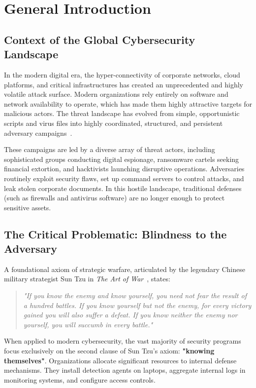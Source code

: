 \chapter*{General Introduction}

\section*{Context of the Global Cybersecurity Landscape}
In the modern digital era, the hyper-connectivity of corporate networks, cloud platforms, and critical infrastructures has created an unprecedented and highly volatile attack surface. Modern organizations rely entirely on software and network availability to operate, which has made them highly attractive targets for malicious actors. The threat landscape has evolved from simple, opportunistic scripts and virus files into highly coordinated, structured, and persistent adversary campaigns~\cite{networks_cybersecurity}. 

These campaigns are led by a diverse array of threat actors, including sophisticated groups conducting digital espionage, ransomware cartels seeking financial extortion, and hacktivists launching disruptive operations. Adversaries routinely exploit security flaws, set up command servers to control attacks, and leak stolen corporate documents. In this hostile landscape, traditional defenses (such as firewalls and antivirus software) are no longer enough to protect sensitive assets.

\section*{The Critical Problematic: Blindness to the Adversary}
A foundational axiom of strategic warfare, articulated by the legendary Chinese military strategist Sun Tzu in \emph{The Art of War}~\cite{art_of_war}, states:
\begin{quote}
    \emph{"If you know the enemy and know yourself, you need not fear the result of a hundred battles. If you know yourself but not the enemy, for every victory gained you will also suffer a defeat. If you know neither the enemy nor yourself, you will succumb in every battle."}
\end{quote}

When applied to modern cybersecurity, the vast majority of security programs focus exclusively on the second clause of Sun Tzu's axiom: \textbf{"knowing themselves"}. Organizations allocate significant resources to internal defense mechanisms. They install detection agents on laptops, aggregate internal logs in monitoring systems, and configure access controls. 

